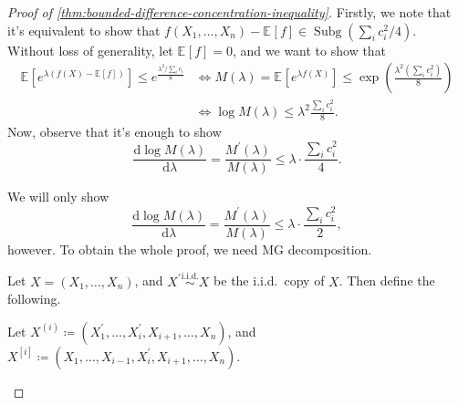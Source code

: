 \begin{proof}[Proof of \autoref{thm:bounded-difference-concentration-inequality}]
	Firstly, we note that it's equivalent to show that \(f(X_1, \dots , X_n) - \mathbb{E}_{}\left[f \right] \in \mathop{\mathrm{Subg}}(\sum_{i} c_i^2 / 4) \). Without loss of generality, let \(\mathbb{E}_{}\left[f \right] = 0\), and we want to show that
	\[
		\begin{split}
			\mathbb{E}_{}\left[e^{\lambda (f(X) - \mathbb{E}_{}\left[f \right] )} \right] \leq e^{\frac{\lambda ^2 / \sum_{i} c_i}{8}}
			&\iff  M(\lambda ) = \mathbb{E}_{}\left[e^{\lambda f(X)} \right] \leq \exp \left( \frac{\lambda ^2 \left( \sum_{i} c_i^2 \right) }{8} \right) \\
			&\iff  \log M(\lambda ) \leq \lambda ^2 \frac{\sum_{i} c_i^2}{8}.
		\end{split}
	\]
	Now, observe that it's enough to show
	\[
		\frac{\mathrm{d}\log M(\lambda )}{\mathrm{d}\lambda } = \frac{M^{\prime} (\lambda )}{M(\lambda )} \leq \lambda \cdot \frac{\sum_{i} c_i^2}{4}.
	\]

	\begin{note}
		We will only show
		\[
			\frac{\mathrm{d}\log M(\lambda )}{\mathrm{d}\lambda } = \frac{M^{\prime} (\lambda )}{M(\lambda )} \leq \lambda \cdot \frac{\sum_{i} c_i^2}{2},
		\]
		however. To obtain the whole proof, we need MG decomposition.
	\end{note}
	Let \(X = (X_1, \dots , X_n)\), and \(X^{\prime} \overset{\text{i.i.d.} }{\sim } X\) be the i.i.d.\ copy of \(X\). Then define the following.
	\begin{notation}\label{not:lec5}
		Let \(X^{(i)} \coloneqq (X_1^{\prime} , \dots , X_i^{\prime} , X_{i+1}, \dots , X_n)\), and \(X^{[i]} \coloneqq (X_1, \dots , X_{i-1}, X_i^{\prime} , X_{i+1}, \dots , X_n)\).
	\end{notation}


\end{proof}

